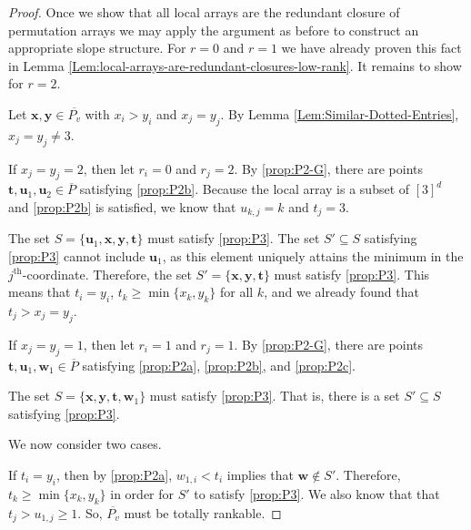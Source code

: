 \documentclass{amsart}
\begin{document}
	\begin{proof}
		Once we show that all local arrays are the redundant closure of permutation arrays we may apply the argument as before to construct an appropriate slope structure. For $r = 0$ and $r = 1$ we have already proven this fact in Lemma \ref{Lem:local-arrays-are-redundant-closures-low-rank}. It remains to show for $r = 2$.
		
		Let $\mathbf{x}, \mathbf{y} \in \overline{P_v}$ with $x_i > y_i$ and $x_j = y_j$. By Lemma \ref{Lem:Similar-Dotted-Entries}, $x_j = y_j \neq 3$.
		
		If $x_j = y_j = 2$, then let $r_i = 0$ and $r_j = 2$. By \ref{prop:P2-G}, there are points $\mathbf{t}, \mathbf{u}_1, \mathbf{u}_{2} \in \overline{P}$ satisfying \ref{prop:P2b}. Because the local array is a subset of $[3]^d$ and \ref{prop:P2b} is satisfied, we know that $u_{k,j} = k$ and $t_j = 3$. 
		
		The set $S = \{ \mathbf{u}_1, \mathbf{x}, \mathbf{y}, \mathbf{t} \}$ must satisfy \ref{prop:P3}. The set $S' \subseteq S$ satisfying \ref{prop:P3} cannot include $\mathbf{u}_1$, as this element uniquely attains the minimum in the $j^{\text{th}}$-coordinate. Therefore, the set $S' = \{ \mathbf{x}, \mathbf{y}, \mathbf{t} \}$ must satisfy \ref{prop:P3}. This means that $t_i = y_i$, $t_k \geq \min \{ x_k, y_k \}$ for all $k$, and we already found that $t_j > x_j = y_j$.
		
		If $x_j = y_j = 1$, then let $r_i = 1$ and $r_j = 1$. By \ref{prop:P2-G}, there are points $\mathbf{t}, \mathbf{u}_1, \mathbf{w}_{1} \in \overline{P}$ satisfying \ref{prop:P2a}, \ref{prop:P2b}, and \ref{prop:P2c}. 
		
		The set $S = \{ \mathbf{x}, \mathbf{y}, \mathbf{t}, \mathbf{w}_1 \}$ must satisfy \ref{prop:P3}. That is, there is a set $S' \subseteq S$ satisfying \ref{prop:P3}.
		
		We now consider two cases.
		
		If $t_i = y_i$, then by \ref{prop:P2a}, $w_{1,i} < t_i$ implies that $\mathbf{w} \not \in S'$. Therefore, $t_k \geq \min \{ x_k, y_k \}$ in order for $S'$ to satisfy \ref{prop:P3}. We also know that that $t_j > u_{1,j} \geq 1$. So, $\overline{P_v}$ must be totally rankable.
		

\end{proof}
\end{document}
